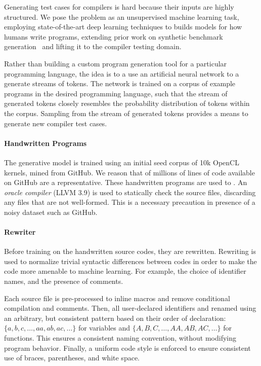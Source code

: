 Generating test cases for compilers is hard because their inputs are highly structured. We pose the problem as an unsupervised machine learning task, employing state-of-the-art deep learning techniques to builds models for how humans write programs, extending prior work on synthetic benchmark generation~\cite{Cummins2017a} and lifting it to the compiler testing domain.


Rather than building a custom program generation tool for a particular programming language, the idea is to a use an artificial neural network to a generate streams of tokens. The network is trained on a corpus of example programs in the desired programming language, such that the stream of generated tokens closely resembles the probability distribution of tokens within the corpus. Sampling from the stream of generated tokens provides a means to generate new compiler test cases.

\paragraph{Handwritten Programs} The generative model is trained using an initial seed corpus of 10k OpenCL kernels, mined from GitHub. We reason that of millions of lines of code available on GitHub are a representative. These handwritten programs are used to . An \emph{oracle compiler} (LLVM 3.9) is used to statically check the source files, discarding any files that are not well-formed. This is a necessary precaution in presence of a noisy dataset such as GitHub.

\paragraph{Rewriter} Before training on the handwritten source codes, they are rewritten. Rewriting is used to normalize trivial syntactic differences between codes in order to make the code more amenable to machine learning. For example, the choice of identifier names, and the presence of comments.

Each source file is pre-processed to inline macros and remove conditional compilation and comments. Then, all user-declared identifiers and renamed using an arbitrary, but consistent pattern based on their order of declaration: $\{a,\allowbreak b,\allowbreak c,\allowbreak \ldots,\allowbreak aa,\allowbreak ab,\allowbreak ac,\allowbreak \ldots\}$ for variables and $\{A,\allowbreak B,\allowbreak C,\allowbreak \ldots,\allowbreak AA,\allowbreak AB,\allowbreak AC,\allowbreak \ldots\}$ for functions. This ensures a consistent naming convention, without modifying program behavior. Finally, a uniform code style is enforced to ensure consistent use of braces, parentheses, and white space.

